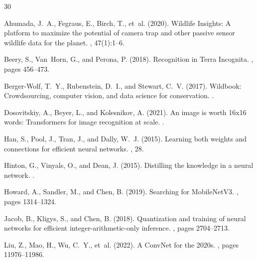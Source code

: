\documentclass[11pt,a4paper]{article}
\begin{document}
\begin{thebibliography}{30}

Ahumada, J.~A., Fegraus, E., Birch, T., et~al. (2020).
\newblock Wildlife Insights: A platform to maximize the potential of camera trap and other passive sensor wildlife data for the planet.
, 47(1):1--6.

Beery, S., Van~Horn, G., and Perona, P. (2018).
\newblock Recognition in Terra Incognita.
, pages 456--473.

Berger-Wolf, T.~Y., Rubenstein, D.~I., and Stewart, C.~V. (2017).
\newblock Wildbook: Crowdsourcing, computer vision, and data science for conservation.
.

Dosovitskiy, A., Beyer, L., and Kolesnikov, A. (2021).
\newblock An image is worth 16x16 words: Transformers for image recognition at scale.
.

Han, S., Pool, J., Tran, J., and Dally, W.~J. (2015).
\newblock Learning both weights and connections for efficient neural networks.
, 28.

Hinton, G., Vinyals, O., and Dean, J. (2015).
\newblock Distilling the knowledge in a neural network.
.

Howard, A., Sandler, M., and Chen, B. (2019).
\newblock Searching for MobileNetV3.
, pages 1314--1324.

Jacob, B., Kligys, S., and Chen, B. (2018).
\newblock Quantization and training of neural networks for efficient integer-arithmetic-only inference.
, pages 2704--2713.

Liu, Z., Mao, H., Wu, C.~Y., et~al. (2022).
\newblock A ConvNet for the 2020s.
, pages 11976--11986.


\end{thebibliography}
\end{document}
